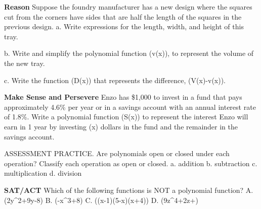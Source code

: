 \documentclass{article}
\newenvironment{practice}[2]{}{}        %
\newcommand{\answer}[1]{}               %
\begin{document}
\begin{practice}{28}{2}
\textbf{Reason} Suppose the foundry manufacturer has a new design where the squares cut from the corners have sides that are half the length of the squares in the previous design.
a. Write expressions for the length, width, and height of this tray.
\answer{a. length (=20-x); width (=14-x); height (=\frac{1}{2}x)}
b. Write and simplify the polynomial function (v(x)), to represent the volume of the new tray.
\answer{b. (v(x)=(14-x)(20-x)(\frac{1}{2}x)=\frac{1}{2}x^3-17x^2+140x)}
c. Write the function (D(x)) that represents the difference, (V(x)-v(x)).
\answer{c. (D(x)=\frac{7}{2}x^3-51x^2+140x)}
\end{practice}
\begin{practice}{29}{2}
\textbf{Make Sense and Persevere} Enzo has \$1,000 to invest in a fund that pays approximately 4.6\% per year or in a savings account with an annual interest rate of 1.8\%. Write a polynomial function (S(x)) to represent the interest Enzo will earn in 1 year by investing (x) dollars in the fund and the remainder in the savings account.
\answer{(S(x)=0.028x+18)}
\end{practice}
\begin{practice}{30}{2}
ASSESSMENT PRACTICE. Are polynomials open or closed under each operation? Classify each operation as open or closed.
a. addition
b. subtraction
c. multiplication
d. division
\answer{a. closed; b. closed; c. closed; d. open}
\end{practice}
\begin{practice}{31}{2}
\textbf{SAT/ACT} Which of the following functions is NOT a polynomial function?
A. (2y^2+9y-8)
B. (-x^3+8)
C. ((x-1)(5-x)(x+4))
D. (9z^4+2z+)
\answer{D}
\end{practice}
\end{document}
